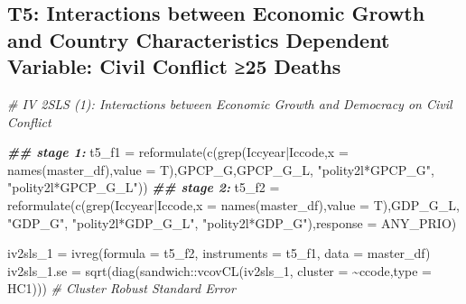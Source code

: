 \documentclass[
]{article}
\newenvironment{Shaded}{\begin{snugshade}}{\end{snugshade}}
\newcommand{\AttributeTok}[1]{\textcolor[rgb]{0.77,0.63,0.00}{#1}}
\newcommand{\CommentTok}[1]{\textcolor[rgb]{0.56,0.35,0.01}{\textit{#1}}}
\newcommand{\DocumentationTok}[1]{\textcolor[rgb]{0.56,0.35,0.01}{\textbf{\textit{#1}}}}
\newcommand{\FunctionTok}[1]{\textcolor[rgb]{0.00,0.00,0.00}{#1}}
\newcommand{\NormalTok}[1]{#1}
\newcommand{\OtherTok}[1]{\textcolor[rgb]{0.56,0.35,0.01}{#1}}
\newcommand{\SpecialCharTok}[1]{\textcolor[rgb]{0.00,0.00,0.00}{#1}}
\newcommand{\StringTok}[1]{\textcolor[rgb]{0.31,0.60,0.02}{#1}}
\begin{document}
\hypertarget{t5-interactions-between-economic-growth-and-country-characteristics-dependent-variable-civil-conuxfb02ict-25-deaths}{%
\subsection{T5: Interactions between Economic Growth and Country
Characteristics Dependent Variable: Civil Conﬂict ≥25
Deaths}\label{t5-interactions-between-economic-growth-and-country-characteristics-dependent-variable-civil-conuxfb02ict-25-deaths}}

\begin{Shaded}
\begin{Highlighting}[]
\CommentTok{\# IV 2SLS (1): Interactions between Economic Growth and Democracy on Civil Conﬂict}

\DocumentationTok{\#\# stage 1:}
\NormalTok{t5\_f1 }\OtherTok{=} \FunctionTok{reformulate}\NormalTok{(}\FunctionTok{c}\NormalTok{(}\FunctionTok{grep}\NormalTok{(}\StringTok{\textquotesingle{}Iccyear|Iccode\textquotesingle{}}\NormalTok{,}\AttributeTok{x =} \FunctionTok{names}\NormalTok{(master\_df),}\AttributeTok{value =}\NormalTok{ T),}\StringTok{\textquotesingle{}GPCP\_G\textquotesingle{}}\NormalTok{,}\StringTok{\textquotesingle{}GPCP\_G\_L\textquotesingle{}}\NormalTok{, }\StringTok{"polity2l*GPCP\_G"}\NormalTok{, }\StringTok{"polity2l*GPCP\_G\_L"}\NormalTok{))}
\DocumentationTok{\#\# stage 2: }
\NormalTok{t5\_f2 }\OtherTok{=} \FunctionTok{reformulate}\NormalTok{(}\FunctionTok{c}\NormalTok{(}\FunctionTok{grep}\NormalTok{(}\StringTok{\textquotesingle{}Iccyear|Iccode\textquotesingle{}}\NormalTok{,}\AttributeTok{x =} \FunctionTok{names}\NormalTok{(master\_df),}\AttributeTok{value =}\NormalTok{ T),}\StringTok{\textquotesingle{}GDP\_G\_L\textquotesingle{}}\NormalTok{, }\StringTok{"GDP\_G"}\NormalTok{, }\StringTok{"polity2l*GDP\_G\_L"}\NormalTok{, }\StringTok{"polity2l*GDP\_G"}\NormalTok{),}\AttributeTok{response =} \StringTok{\textquotesingle{}ANY\_PRIO\textquotesingle{}}\NormalTok{)}

\NormalTok{iv2sls\_1 }\OtherTok{=} \FunctionTok{ivreg}\NormalTok{(}\AttributeTok{formula =}\NormalTok{ t5\_f2, }\AttributeTok{instruments =}\NormalTok{ t5\_f1, }\AttributeTok{data =}\NormalTok{ master\_df)}
\NormalTok{iv2sls\_1.se }\OtherTok{=} \FunctionTok{sqrt}\NormalTok{(}\FunctionTok{diag}\NormalTok{(sandwich}\SpecialCharTok{::}\FunctionTok{vcovCL}\NormalTok{(iv2sls\_1, }\AttributeTok{cluster =} \SpecialCharTok{\textasciitilde{}}\NormalTok{ccode,}\AttributeTok{type =} \StringTok{\textquotesingle{}HC1\textquotesingle{}}\NormalTok{))) }\CommentTok{\# Cluster Robust Standard Error}



\end{Highlighting}
\end{Shaded}
\end{document}
